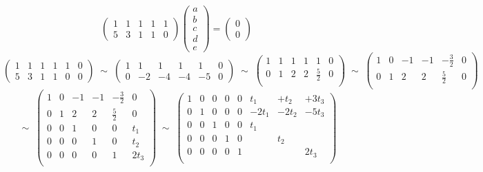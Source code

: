 \documentclass[12pt]{article}
\begin{document}
\begin{enumerate}
\begin{enumerate}
      \[
        \left(\begin{array}{ccccc}
          1&1&1&1&1 \\
          5&3&1&1&0
        \end{array}\right) \left(\begin{array}{c}
          a\\b\\c\\d\\e
        \end{array}\right) = \left(\begin{array}{c}
          0\\0
        \end{array}\right)
      \]
      \[
        \left(\begin{array}{ccccc|c}
          1&1&1&1&1&0 \\
          5&3&1&1&0&0
        \end{array}\right)
        \;\sim\;
        \left(\begin{array}{ccccc|c}
          1&1&1&1&1&0 \\
          0&-2&-4&-4&-5&0
        \end{array}\right)
        \;\sim\;
        \left(\begin{array}{ccccc|c}
          1&1&1&1&1&0 \\
          0&1&2&2&\frac{5}{2}&0 \\
        \end{array}\right)
        \;\sim\;
        \left(\begin{array}{ccccc|c}
          1&0&-1&-1&-\frac{3}{2}&0 \\
          0&1&2&2&\frac{5}{2}&0 \\
        \end{array}\right)
      \]
      \[
        \;\sim\;
        \left(\begin{array}{ccccc|c}
          1&0&-1&-1&-\frac{3}{2}&0 \\
          0&1&2&2&\frac{5}{2}&0 \\ \hline
          0 & 0 & 1 & 0 & 0 & t_1 \\
          0 & 0 & 0 & 1 & 0 & t_2 \\
          0 & 0 & 0 & 0 & 1 & 2t_3 \\
        \end{array}\right)
        \;\sim\;
        \left(\begin{array}{ccccc|ccc}
          1&0&0&0&0&t_1&+t_2&+3t_3 \\
          0&1&0&0&0& -2t_1 &-2t_2& - 5t_3 \\ \hline
          0 & 0 & 1 & 0 & 0 & t_1&& \\
          0 & 0 & 0 & 1 & 0 & &t_2& \\
          0 & 0 & 0 & 0 & 1 & &&2t_3 \\
        \end{array}\right)
      \]


\end{enumerate}
\end{enumerate}
\end{document}
